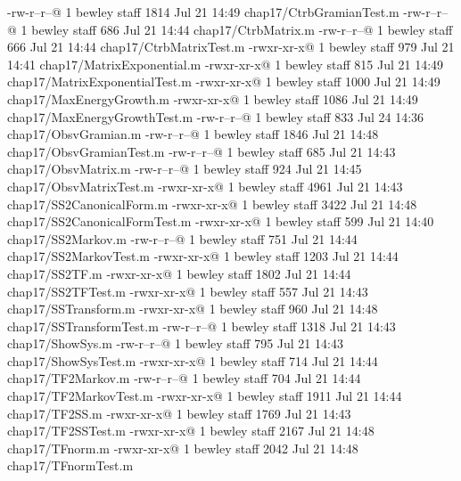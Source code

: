 -rw-r--r--@ 1 bewley  staff   1814 Jul 21 14:49 chap17/CtrbGramianTest.m
-rw-r--r--@ 1 bewley  staff    686 Jul 21 14:44 chap17/CtrbMatrix.m
-rw-r--r--@ 1 bewley  staff    666 Jul 21 14:44 chap17/CtrbMatrixTest.m
-rwxr-xr-x@ 1 bewley  staff    979 Jul 21 14:41 chap17/MatrixExponential.m
-rwxr-xr-x@ 1 bewley  staff    815 Jul 21 14:49 chap17/MatrixExponentialTest.m
-rwxr-xr-x@ 1 bewley  staff   1000 Jul 21 14:49 chap17/MaxEnergyGrowth.m
-rwxr-xr-x@ 1 bewley  staff   1086 Jul 21 14:49 chap17/MaxEnergyGrowthTest.m
-rw-r--r--@ 1 bewley  staff    833 Jul 24 14:36 chap17/ObsvGramian.m
-rw-r--r--@ 1 bewley  staff   1846 Jul 21 14:48 chap17/ObsvGramianTest.m
-rw-r--r--@ 1 bewley  staff    685 Jul 21 14:43 chap17/ObsvMatrix.m
-rw-r--r--@ 1 bewley  staff    924 Jul 21 14:45 chap17/ObsvMatrixTest.m
-rwxr-xr-x@ 1 bewley  staff   4961 Jul 21 14:43 chap17/SS2CanonicalForm.m
-rwxr-xr-x@ 1 bewley  staff   3422 Jul 21 14:48 chap17/SS2CanonicalFormTest.m
-rwxr-xr-x@ 1 bewley  staff    599 Jul 21 14:40 chap17/SS2Markov.m
-rw-r--r--@ 1 bewley  staff    751 Jul 21 14:44 chap17/SS2MarkovTest.m
-rwxr-xr-x@ 1 bewley  staff   1203 Jul 21 14:44 chap17/SS2TF.m
-rwxr-xr-x@ 1 bewley  staff   1802 Jul 21 14:44 chap17/SS2TFTest.m
-rwxr-xr-x@ 1 bewley  staff    557 Jul 21 14:43 chap17/SSTransform.m
-rwxr-xr-x@ 1 bewley  staff    960 Jul 21 14:48 chap17/SSTransformTest.m
-rw-r--r--@ 1 bewley  staff   1318 Jul 21 14:43 chap17/ShowSys.m
-rw-r--r--@ 1 bewley  staff    795 Jul 21 14:43 chap17/ShowSysTest.m
-rwxr-xr-x@ 1 bewley  staff    714 Jul 21 14:44 chap17/TF2Markov.m
-rw-r--r--@ 1 bewley  staff    704 Jul 21 14:44 chap17/TF2MarkovTest.m
-rwxr-xr-x@ 1 bewley  staff   1911 Jul 21 14:44 chap17/TF2SS.m
-rwxr-xr-x@ 1 bewley  staff   1769 Jul 21 14:43 chap17/TF2SSTest.m
-rwxr-xr-x@ 1 bewley  staff   2167 Jul 21 14:48 chap17/TFnorm.m
-rwxr-xr-x@ 1 bewley  staff   2042 Jul 21 14:48 chap17/TFnormTest.m

